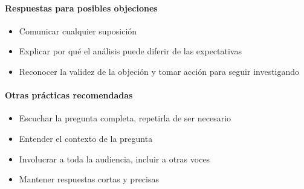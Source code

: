 \paragraph{Respuestas para posibles objeciones}
\begin{itemize}
    \item {Comunicar cualquier suposición}
    \item {Explicar por qué el análisis puede diferir de las expectativas}
    \item {Reconocer la validez de la objeción y tomar acción para seguir investigando}
\end{itemize}

\paragraph{Otras prácticas recomendadas}
\begin{itemize}
    \item {Escuchar la pregunta completa, repetirla de ser necesario}
    \item {Entender el contexto de la pregunta}
    \item {Involucrar a toda la audiencia, incluir a otras voces}
    \item {Mantener respuestas cortas y precisas}
\end{itemize}

